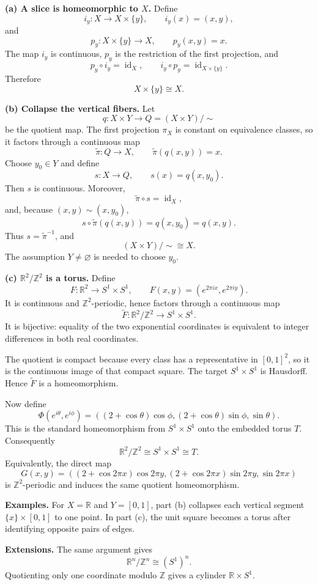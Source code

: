 \begin{solution}

\par\smallskip\noindent\textbf{(a) A slice is homeomorphic to \(X\).}
Define
\[
i_y:X\to X\times\{y\},\qquad i_y(x)=(x,y),
\]
and
\[
p_y:X\times\{y\}\to X,\qquad p_y(x,y)=x.
\]
The map \(i_y\) is continuous, \(p_y\) is the restriction of the first
projection, and
\[
p_y\circ i_y=\operatorname{id}_X,
\qquad
i_y\circ p_y=\operatorname{id}_{X\times\{y\}}.
\]
Therefore
\[
\boxed{X\times\{y\}\cong X.}
\]

\par\smallskip\noindent\textbf{(b) Collapse the vertical fibers.}
Let
\[
q:X\times Y\to Q=(X\times Y)/{\sim}
\]
be the quotient map. The first projection \(\pi_X\) is constant on equivalence
classes, so it factors through a continuous map
\[
\widetilde\pi:Q\to X,
\qquad
\widetilde\pi(q(x,y))=x.
\]
Choose \(y_0\in Y\) and define
\[
s:X\to Q,
\qquad
s(x)=q(x,y_0).
\]
Then \(s\) is continuous. Moreover,
\[
\widetilde\pi\circ s=\operatorname{id}_X,
\]
and, because \((x,y)\sim(x,y_0)\),
\[
s\circ\widetilde\pi(q(x,y))
=q(x,y_0)=q(x,y).
\]
Thus \(s=\widetilde\pi^{-1}\), and
\[
\boxed{(X\times Y)/{\sim}\cong X.}
\]
The assumption \(Y\ne\varnothing\) is needed to choose \(y_0\).

\par\smallskip\noindent\textbf{(c) \(\mathbb R^2/\mathbb Z^2\) is a torus.}
Define
\[
F:\mathbb R^2\to S^1\times S^1,
\qquad
F(x,y)=(e^{2\pi i x},e^{2\pi i y}).
\]
It is continuous and \(\mathbb Z^2\)-periodic, hence factors through a
continuous map
\[
\widetilde F:\mathbb R^2/\mathbb Z^2\to S^1\times S^1.
\]
It is bijective: equality of the two exponential coordinates is equivalent to
integer differences in both real coordinates.

The quotient is compact because every class has a representative in
\([0,1]^2\), so it is the continuous image of that compact square. The target
\(S^1\times S^1\) is Hausdorff. Hence \(\widetilde F\) is a homeomorphism.

Now define
\[
\Phi(e^{i\theta},e^{i\phi})
=
((2+\cos\theta)\cos\phi,
 (2+\cos\theta)\sin\phi,
 \sin\theta).
\]
This is the standard homeomorphism from \(S^1\times S^1\) onto the embedded
torus \(T\). Consequently
\[
\boxed{
\mathbb R^2/\mathbb Z^2
\cong
S^1\times S^1
\cong
T.}
\]
Equivalently, the direct map
\[
G(x,y)=
((2+\cos2\pi x)\cos2\pi y,
 (2+\cos2\pi x)\sin2\pi y,
 \sin2\pi x)
\]
is \(\mathbb Z^2\)-periodic and induces the same quotient homeomorphism.

\medskip
\noindent\textbf{Examples.}
For \(X=\mathbb R\) and \(Y=[0,1]\), part (b) collapses each vertical segment
\(\{x\}\times[0,1]\) to one point. In part (c), the unit square becomes a
torus after identifying opposite pairs of edges.

\medskip
\noindent\textbf{Extensions.}
The same argument gives
\[
\mathbb R^n/\mathbb Z^n\cong(S^1)^n.
\]
Quotienting only one coordinate modulo \(\mathbb Z\) gives a cylinder
\(\mathbb R\times S^1\).
\end{solution}



